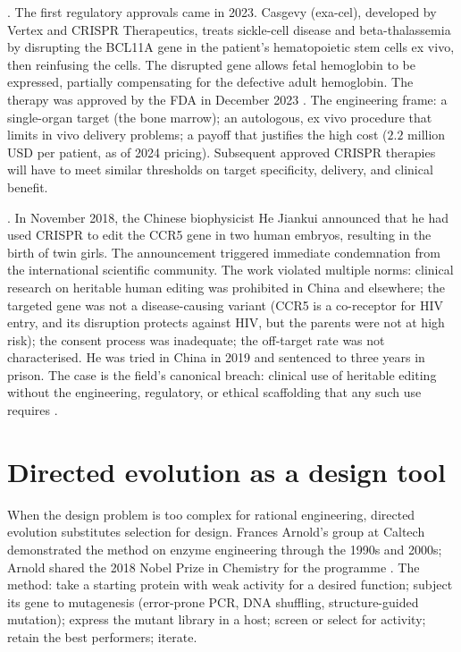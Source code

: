 . The first regulatory approvals
came in 2023. Casgevy (exa-cel), developed by Vertex and CRISPR
Therapeutics, treats sickle-cell disease and beta-thalassemia by
disrupting the BCL11A gene in the patient's hematopoietic stem cells
ex vivo, then reinfusing the cells. The disrupted gene allows fetal
hemoglobin to be expressed, partially compensating for the defective
adult hemoglobin. The therapy was approved by the FDA in December
2023 \cite{web:v6c09-fda-casgevy-2023}. The engineering frame: a
single-organ target (the bone marrow); an autologous, ex vivo
procedure that limits in vivo delivery problems; a payoff that
justifies the high cost ($2.2$ million USD per patient, as of 2024
pricing). Subsequent approved CRISPR therapies will have to meet
similar thresholds on target specificity, delivery, and clinical
benefit.

. In November 2018, the Chinese
biophysicist He Jiankui announced that he had used CRISPR to edit
the CCR5 gene in two human embryos, resulting in the birth of
twin girls. The announcement triggered immediate condemnation from
the international scientific community. The work violated
multiple norms: clinical research on heritable human editing was
prohibited in China and elsewhere; the targeted gene was not a
disease-causing variant (CCR5 is a co-receptor for HIV entry, and
its disruption protects against HIV, but the parents were not at
high risk); the consent process was inadequate; the off-target
rate was not characterised. He was tried in China in 2019 and
sentenced to three years in prison. The case is the field's
canonical breach: clinical use of heritable editing without the
engineering, regulatory, or ethical scaffolding that any such use
requires \cite[pp.~127--132]{text:v6c09-nas-heritable-editing-2020}.

\section{Directed evolution as a design tool}

When the design problem is too complex for rational engineering,
directed evolution substitutes selection for design. Frances
Arnold's group at Caltech demonstrated the method on enzyme
engineering through the 1990s and 2000s; Arnold shared the 2018
Nobel Prize in Chemistry for the programme
\cite[pp.~1747--1750]{paper:v6c09-arnold-directed-evolution-1998}. The
method: take a starting protein with weak activity for a desired
function; subject its gene to mutagenesis (error-prone PCR, DNA
shuffling, structure-guided mutation); express the mutant library
in a host; screen or select for activity; retain the best
performers; iterate.

